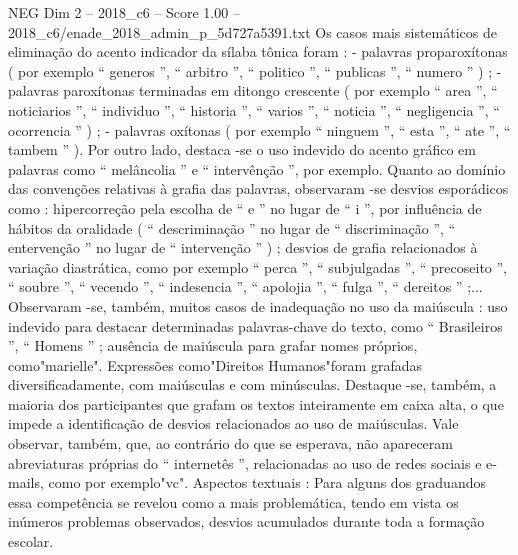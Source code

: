 \begin{textsample}{NEG Dim 2 – 2018\_c6 – Score 1.00 – 2018\_c6/enade\_2018\_admin\_p\_5d727a5391.txt}
Os casos mais sistemáticos de eliminação do acento indicador da sílaba tônica foram : - palavras proparoxítonas ( por exemplo “ generos ”, “ arbitro ”, “ politico ”, “ publicas ”, “ numero ” ) ; - palavras paroxítonas terminadas em ditongo crescente ( por exemplo “ area ”, “ noticiarios ”, “ individuo ”, “ historia ”, “ varios ”, “ noticia ”, “ negligencia ”, “ ocorrencia ” ) ; - palavras oxítonas ( por exemplo “ ninguem ”, “ esta ”, “ ate ”, “ tambem ” ).
Por outro lado, destaca -se o uso indevido do acento gráfico em palavras como “ melâncolia ” e “ intervênção ”, por exemplo.
Quanto ao domínio das convenções relativas à grafia das palavras, observaram -se desvios esporádicos como : hipercorreção pela escolha de “ e ” no lugar de “ i ”, por influência de hábitos da oralidade ( “ descriminação ” no lugar de “ discriminação ”, “ entervenção ” no lugar de “ intervenção ” ) ; desvios de grafia relacionados à variação diastrática, como por exemplo “ perca ”, “ subjulgadas ”, “ precoseito ”, “ soubre ”, “ vecendo ”, “ indesencia ”, “ apolojia ”, “ fulga ”, “ dereitos ” ;...
Observaram -se, também, muitos casos de inadequação no uso da maiúscula : uso indevido para destacar determinadas palavras-chave do texto, como “ Brasileiros ”, “ Homens ” ; ausência de maiúscula para grafar nomes próprios, como"marielle".
Expressões como"Direitos Humanos"foram grafadas diversificadamente, com maiúsculas e com minúsculas.
Destaque -se, também, a maioria dos participantes que grafam os textos inteiramente em caixa alta, o que impede a identificação de desvios relacionados ao uso de maiúsculas.
Vale observar, também, que, ao contrário do que se esperava, não apareceram abreviaturas próprias do “ internetês ”, relacionadas ao uso de redes sociais e e-mails, como por exemplo"vc".
Aspectos textuais : Para alguns dos graduandos essa competência se revelou como a mais problemática, tendo em vista os inúmeros problemas observados, desvios acumulados durante toda a formação escolar.

\end{textsample}
